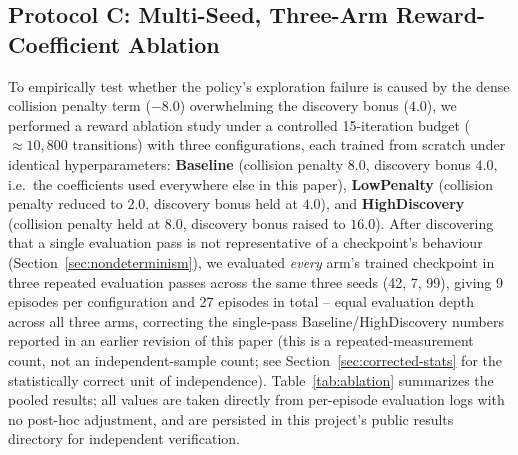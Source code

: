 \documentclass[11pt]{article}
\begin{document}
\subsection{Protocol C: Multi-Seed, Three-Arm Reward-Coefficient Ablation}
\label{sec:ablation}
To empirically test whether the policy's exploration failure is caused by
the dense collision penalty term ($-8.0$) overwhelming the discovery bonus
($4.0$), we performed a reward ablation study under a controlled 15-iteration
budget ($\approx 10{,}800$ transitions) with three configurations, each
trained from scratch under identical hyperparameters: \textbf{Baseline}
(collision penalty $8.0$, discovery bonus $4.0$, i.e.\ the coefficients
used everywhere else in this paper), \textbf{LowPenalty} (collision
penalty reduced to $2.0$, discovery bonus held at $4.0$), and
\textbf{HighDiscovery} (collision penalty held at $8.0$, discovery bonus
raised to $16.0$). After discovering that a single evaluation pass is not
representative of a checkpoint's behaviour
(Section~\ref{sec:nondeterminism}), we evaluated \emph{every} arm's
trained checkpoint in three repeated evaluation passes across the same three
seeds (42, 7, 99), giving 9 episodes per configuration and 27 episodes in
total -- equal evaluation depth across all three arms, correcting the
single-pass Baseline/HighDiscovery numbers reported in an earlier
revision of this paper (this is a repeated-measurement count, not an
independent-sample count; see Section~\ref{sec:corrected-stats} for the
statistically correct unit of independence). Table~\ref{tab:ablation}
summarizes the pooled results; all values are taken directly from
per-episode evaluation logs with no post-hoc
adjustment, and are persisted in this project's public results directory
for independent verification.
\end{document}
